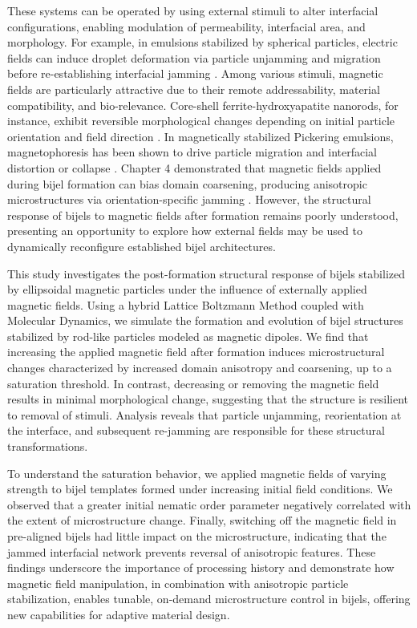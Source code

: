 These systems can be operated by using external stimuli to alter interfacial configurations, 
enabling modulation of permeability, interfacial area, and morphology. For example, in emulsions stabilized by spherical particles, electric fields can induce droplet deformation via 
particle unjamming and migration before re-establishing interfacial jamming \cite{cui_stabilizing_2013}. Among various stimuli, magnetic fields are particularly attractive due to their 
remote addressability, material compatibility, and bio-relevance. Core-shell ferrite-hydroxyapatite nanorods, for instance, exhibit reversible morphological changes depending on initial 
particle orientation and field direction \cite{nakayama_stimuli-responsive_2018}. In magnetically stabilized Pickering emulsions, magnetophoresis has been shown to drive particle migration 
and interfacial distortion or collapse \cite{tham_magnetophoresis_2021, yang_rapid_2020, misra_magnetic_2020}. Chapter 4 demonstrated that magnetic fields applied during bijel formation can 
bias domain coarsening, producing anisotropic microstructures via orientation-specific jamming \cite{karthikeyan_formation_2024}. However, the structural response of bijels to magnetic fields 
after formation remains poorly understood, presenting an opportunity to explore how external fields may be used to dynamically reconfigure established bijel architectures.

This study investigates the post-formation structural response of bijels stabilized by ellipsoidal magnetic particles under the influence of externally applied magnetic fields. 
Using a hybrid Lattice Boltzmann Method coupled with Molecular Dynamics, we simulate the formation and evolution of bijel structures stabilized by rod-like particles modeled as 
magnetic dipoles. We find that increasing the applied magnetic field after formation induces microstructural changes characterized by increased domain anisotropy and 
coarsening, up to a saturation threshold. In contrast, decreasing or removing the magnetic field results in minimal morphological change, suggesting that the structure is
resilient to removal of stimuli. Analysis reveals that particle unjamming, reorientation at the interface, and subsequent re-jamming are responsible for these structural transformations.

To understand the saturation behavior, we applied magnetic fields of varying strength to bijel templates formed under increasing initial field conditions. We observed that 
a greater initial nematic order parameter negatively correlated with the extent of microstructure change. Finally, switching off the magnetic field in pre-aligned bijels had little 
impact on the microstructure, indicating that the jammed interfacial network prevents reversal of anisotropic features. These findings underscore the importance of processing 
history and demonstrate how magnetic field manipulation, in combination with anisotropic particle stabilization, enables tunable, on-demand microstructure control in bijels, 
offering new capabilities for adaptive material design.

